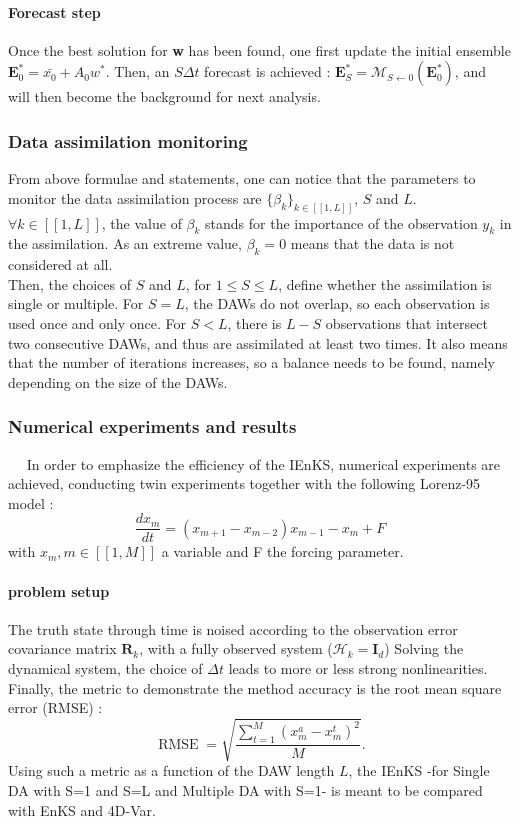 \documentclass[a4,12pt]{article}
\begin{document}
\paragraph{Forecast step}
Once the best solution for \textbf{w} has been found, one first update the initial ensemble $\textbf{E}^{*}_0 = \bar{x_0} + A_{0}w^{*}$. Then, an $S\Delta t$ forecast is achieved : $\textbf{E}^{*}_S = \mathcal{M}_{S\leftarrow 0}(\textbf{E}^{*}_0)$, and will then become the background for next analysis.


\subsubsection{Data assimilation monitoring}
From above formulae and statements, one can notice that the parameters to monitor the data assimilation process are $\{\beta_k\}_{k \in [\![1,L]\!]}$, $S$ and $L$. \\
$\forall k \in [\![1,L]\!]$, the value of $\beta_k$ stands for the importance of the observation $y_k$ in the assimilation. As an extreme value, $\beta_k = 0$ means that the data is not considered at all. \\
Then, the choices of $S$ and $L$, for $1 \le S \le L$, define whether the assimilation is single or multiple. For $S = L$,  the DAWs do not overlap, so each observation is used once and only once. For $S < L$, there is  $L-S$ observations that intersect two consecutive DAWs, and thus are assimilated at least two times. It also means that the number of iterations increases, so a balance needs to be found, namely depending on the size of the DAWs.

\subsubsection{Numerical experiments and results}
~~ In order to emphasize the efficiency of the IEnKS, numerical experiments are achieved, conducting twin experiments together with the following Lorenz-95 model : \\
\begin{equation*}
\frac{dx_m}{dt} = (x_{m+1}-x_{m-2})x_{m-1} - x_m + F
\end{equation*}
with $x_m, m \in [\![1,M]\!]$ a variable and F the forcing parameter. \\
\paragraph{problem setup}
The truth state through time is noised according to the observation error covariance matrix $\textbf{R}_k$, with a fully observed system ($\mathcal{H}_k = \textbf{I}_d$) 
Solving the dynamical system, the choice of $\Delta t$ leads to more or less strong nonlinearities. \\
Finally, the metric to demonstrate the method accuracy is the root mean square error (RMSE) :
$$\operatorname{RMSE}= \sqrt{\frac{\sum_{t=1}^M (x_{m}^{a} - x_{m}^{t})^2}{M}}.$$
Using such a metric as a function of the DAW length $L$, the IEnKS -for Single DA with S=1 and S=L and Multiple DA with S=1- is meant to be compared with EnKS and 4D-Var.
\end{document}
